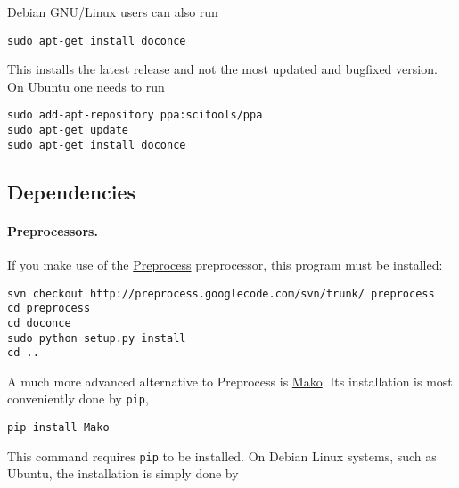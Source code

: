 \documentclass[%
oneside,                 %
final,                   %
10pt]{article}
\begin{document}
Debian GNU/Linux users can also run
\vspace{4pt}
\begin{Verbatim}[numbers=none,frame=lines,label=\fbox{{\tiny Terminal}},fontsize=\fontsize{9pt}{9pt},
labelposition=topline,framesep=2.5mm,framerule=0.7pt]
sudo apt-get install doconce
\end{Verbatim}
This installs the latest release and not the most updated and bugfixed
version.
On Ubuntu one needs to run
\vspace{4pt}
\begin{Verbatim}[numbers=none,frame=lines,label=\fbox{{\tiny Terminal}},fontsize=\fontsize{9pt}{9pt},
labelposition=topline,framesep=2.5mm,framerule=0.7pt]
sudo add-apt-repository ppa:scitools/ppa
sudo apt-get update
sudo apt-get install doconce
\end{Verbatim}

\subsection{Dependencies}

\paragraph{Preprocessors.}
If you make use of the \href{{http://code.google.com/p/preprocess}}{Preprocess}
preprocessor, this program must be installed:

\vspace{4pt}
\begin{Verbatim}[numbers=none,frame=lines,label=\fbox{{\tiny Terminal}},fontsize=\fontsize{9pt}{9pt},
labelposition=topline,framesep=2.5mm,framerule=0.7pt]
svn checkout http://preprocess.googlecode.com/svn/trunk/ preprocess
cd preprocess
cd doconce
sudo python setup.py install
cd ..
\end{Verbatim}

A much more advanced alternative to Preprocess is
\href{{http://www.makotemplates.org}}{Mako}. Its installation is most
conveniently done by {\fontsize{10pt}{10pt}\Verb!pip!},

\vspace{4pt}
\begin{Verbatim}[numbers=none,frame=lines,label=\fbox{{\tiny Terminal}},fontsize=\fontsize{9pt}{9pt},
labelposition=topline,framesep=2.5mm,framerule=0.7pt]
pip install Mako
\end{Verbatim}
This command requires {\fontsize{10pt}{10pt}\Verb!pip!} to be installed. On Debian Linux systems,
such as Ubuntu, the installation is simply done by
\end{document}
